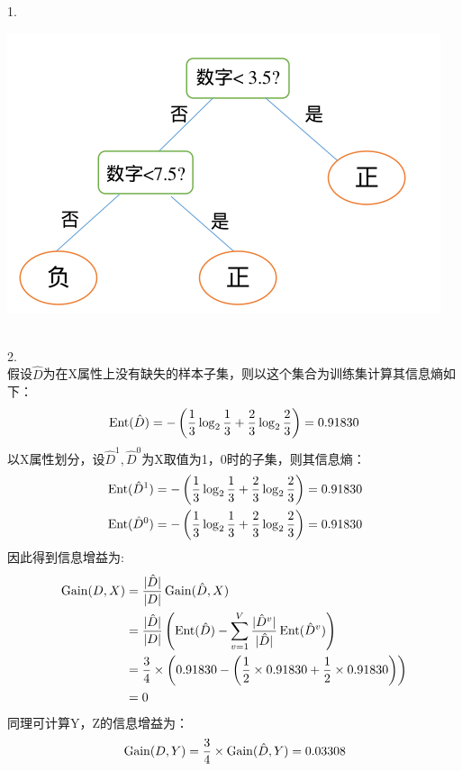 \documentclass[answers]{exam}  %
\begin{document}
\begin{questions}
\begin{enumerate}
\end{enumerate}
	\begin{solution}
	    1.\\
        \centerline{\includegraphics[width=0.5\linewidth]{4.1.png}}\\
        2.\\
        假设$\hat D$为在X属性上没有缺失的样本子集，则以这个集合为训练集计算其信息熵如下：
        $$
        \begin{aligned}
            \operatornamewithlimits{Ent}(\hat D)=-\left(\frac13\log_2\frac13+\frac23\log_2\frac23 \right)=0.91830\\
        \end{aligned}    $$
        以X属性划分，设$\hat D^1,\hat D^0$为X取值为1，0时的子集，则其信息熵：
        $$
        \begin{aligned}
            &\operatornamewithlimits{Ent}(\hat D^1)=-\left(\frac13\log_2\frac13+\frac23\log_2\frac23 \right)=0.91830\\
            &\operatornamewithlimits{Ent}(\hat D^0)=-\left(\frac13\log_2\frac13+\frac23\log_2\frac23 \right)=0.91830\\
        \end{aligned}    $$
        因此得到信息增益为:
        $$\begin{aligned}
        \operatornamewithlimits{Gain}(D,X)
            &=\frac{|\hat D|}{|D|}\operatornamewithlimits{Gain}(\hat D,X)\\
            &=\frac{|\hat D|}{|D|}\left(\operatornamewithlimits{Ent}(\hat D)-\sum^V_{v=1}\frac{|\hat D^v|}{|\hat D|}\operatornamewithlimits{Ent}(\hat D^v) \right)\\
            &=\frac34\times\left(0.91830-\left(\frac12\times0.91830+\frac12\times0.91830 \right) \right)\\
            &=0\\
        \end{aligned} $$
        同理可计算Y，Z的信息增益为：
        $$\begin{aligned}
            &\operatornamewithlimits{Gain}(D,Y)=\frac34\times\operatornamewithlimits{Gain}(\hat D,Y)=0.03308\\

\end{aligned}$$
\end{solution}
\end{questions}
\end{document}

